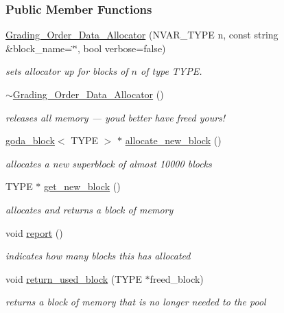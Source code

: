 \subsubsection*{Public Member Functions}
\begin{DoxyCompactItemize}
\item 
\hyperlink{group__memorygroup_ad093115aea9e8428a9ef8136a008b72b}{Grading\+\_\+\+Order\+\_\+\+Data\+\_\+\+Allocator} (N\+V\+A\+R\+\_\+\+T\+Y\+PE n, const string \&block\+\_\+name=\char`\"{}\char`\"{}, bool verbose=false)
\begin{DoxyCompactList}\small\item\em sets allocator up for blocks of $n$ of type {\ttfamily T\+Y\+PE}. \end{DoxyCompactList}\item 
\mbox{\label{group__memorygroup_a01de71b688612c55185fc1fb7fd531b9}} 
\hyperlink{group__memorygroup_a01de71b688612c55185fc1fb7fd531b9}{$\sim$\+Grading\+\_\+\+Order\+\_\+\+Data\+\_\+\+Allocator} ()
\begin{DoxyCompactList}\small\item\em releases all memory --- you\textquotesingle{}d better have freed yours! \end{DoxyCompactList}\item 
\hyperlink{group__memorygroup_uniongoda__block}{goda\+\_\+block}$<$ T\+Y\+PE $>$ $\ast$ \hyperlink{group__memorygroup_a3ac79e785e392024b24c18d60ff3fc3c}{allocate\+\_\+new\+\_\+block} ()
\begin{DoxyCompactList}\small\item\em allocates a new superblock of almost 10000 blocks \end{DoxyCompactList}\item 
T\+Y\+PE $\ast$ \hyperlink{group__memorygroup_a699e85282a021fd7b06f65b9e773eb30}{get\+\_\+new\+\_\+block} ()
\begin{DoxyCompactList}\small\item\em allocates and returns a block of memory \end{DoxyCompactList}\item 
\mbox{\label{group__memorygroup_a2338be626b78d71175fcd32f6f1bcaf1}} 
void \hyperlink{group__memorygroup_a2338be626b78d71175fcd32f6f1bcaf1}{report} ()
\begin{DoxyCompactList}\small\item\em indicates how many blocks this has allocated \end{DoxyCompactList}\item 
void \hyperlink{group__memorygroup_a518a8f61da93ea93651f426e12761a07}{return\+\_\+used\+\_\+block} (T\+Y\+PE $\ast$freed\+\_\+block)
\begin{DoxyCompactList}\small\item\em returns a block of memory that is no longer needed to the pool \end{DoxyCompactList}\end{DoxyCompactItemize}

